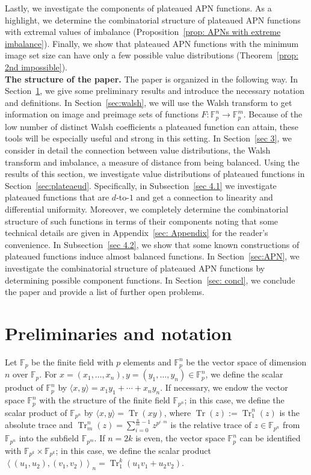 \documentclass[11pt]{article}
\newcommand{\F}{\mathbb F}
\DeclareMathOperator{\Tr}{Tr}
\theoremstyle{plain}
\theoremstyle{definition}
\numberwithin{theorem}{section}
\numberwithin{equation}{section}
\numberwithin{table}{section}
\numberwithin{figure}{section}
\begin{document}
{Lastly, we investigate the components of plateaued APN functions. As a highlight, we determine the combinatorial structure of plateaued APN functions with extremal values of imbalance (Proposition~\ref{prop: APNs with extreme imbalance}). Finally, we show that plateaued APN functions with the minimum image set size can have only a few possible value distributions (Theorem~\ref{prop: 2nd impossible}). \\

\noindent\textbf{The structure of the paper.} The paper is organized in the following way. In Section~\ref{sec: 2}, we give some preliminary results and introduce the necessary notation and definitions. In Section~\ref{sec:walsh}, we will use the Walsh transform to get information on image and preimage sets of functions $F\colon\F_p^n\to\F_p^m$. Because of the low number of distinct Walsh coefficients a plateaued function can attain, these tools will be especially useful and strong in this setting. In Section~\ref{sec 3}, we consider in detail the connection between value distributions, the Walsh transform and imbalance, a measure of distance from being balanced. Using the results of this section, we investigate value distributions of plateaued functions in Section~\ref{sec:plateaeud}. Specifically, in Subsection~\ref{sec 4.1} we investigate plateaued functions that are $d$-to-$1$ and get a connection to linearity and differential uniformity. Moreover, we completely determine the combinatorial structure of such functions in terms of their components noting that some technical details are given in Appendix~\ref{sec: Appendix} for the reader's convenience. In Subsection~\ref{sec 4.2}, we show that some known constructions of plateaued functions induce almost balanced functions. In Section~\ref{sec:APN}, we investigate the combinatorial structure of plateaued APN functions by determining possible component functions. In Section~\ref{sec: concl}, we conclude the paper and provide a list of further open problems. 

\section{Preliminaries and notation}\label{sec: 2}

Let $\F_p$ be the finite field with $p$ elements and $\F_p^n$ be the vector space of dimension $n$ over $\F_p$. For $x=(x_1,\ldots,x_n),y=(y_1,\ldots,y_n)\in\F_p^n$, we define the scalar product of $\F_p^n$ by $\langle x,y\rangle=x_1y_1+\cdots+x_ny_n$. If necessary, we endow the vector space $\F_p^n$ with the structure of the finite field $\F_{p^{n}}$; in this case, we define the scalar product of $\F_{p^n}$ by $\langle x,y\rangle =\Tr(xy)$, where $\Tr(z):=\Tr_1^n(z)$ is the absolute trace and  $\Tr^n_m(z)=\sum_{i=0}^{\frac{n}{m}-1} z^{p^{i\cdot m}}$ is the relative trace of $z \in \mathbb{F}_{p^n}$ from $\mathbb{F}_{p^n}$ into the subfield $\mathbb{F}_{p^m}$. 
If $n=2k$ is even, the vector space $\F_p^n$ can be identified with $\mathbb{F}_{p^k} \times \mathbb{F}_{p^k}$; in this case, we define the scalar product $\left\langle\left(u_1, u_2\right),\left(v_1, v_2\right)\right\rangle_n=\operatorname{Tr}_1^k\left(u_1 v_1+u_2 v_2\right)$. 


}
\end{document}
